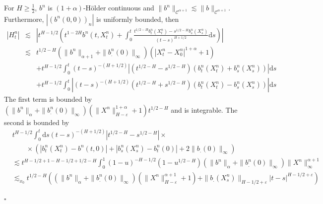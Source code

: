 \documentclass[a4paper,11pt]{article}
\newcommand{\mathd}{\mathrm{d}}
\newenvironment{proof}{{\sc Proof.}}{\hfill$\square$}
\newcommand{\CC}{\mathscr C}
\begin{document}
\begin{proof}
  For $H \geqslant \frac{1}{2}$, $b^{n}$ is $( 1+ \alpha)$-H\"older
  continuous and $\|b^{n} \|_{\CC^{\alpha +1}} \lesssim \|b\|_{\CC^{\alpha
  +1}}$. Furthermore, $|(b^{n} (0,0))_{n} |$ is uniformly bounded, then
  \begin{eqnarray*}
    | H_{t}^{n} | & \lesssim & \left\lvert t^{H-1/2}  \left( t^{1-2H} b^{n}
    (t,X^{n}_{t} )+ \int_{0}^{t} \frac{t^{1/2-H} b^{n}_{t} (X^{n}_{t}
    )-s^{1/2-H} b^{n}_{s} (X^{n}_{s} )}{(t-s)^{H+1/2}} \mathd s \right)
    \right\lvert\\
    & \lesssim & t^{1/2-H} ( \|b^{n} \|_{\alpha +1} + \| b^{n}_{.} ( 0 )
    \|_{\infty} ) (|X^{n}_{t} -X^{n}_{0} |^{1+ \alpha} +1)\\
    &  & +t^{H-1/2}  \int_{0}^{t} (t-s)^{- (H+1/2)}  | ( t^{1/2-H} -s^{1/2-H}
    )  ( b^{n}_{t} (X_{t}^{n} )+b^{n}_{s} (X_{s}^{n} ) ) | \mathd s\\
    &  & +t^{H-1/2}  \int_{0}^{t} | (t-s)^{-(H+1/2)}  ( t^{1/2-H} +s^{1/2-H}
    )  ( b^{n}_{t} (X_{t}^{n} )-b^{n}_{s} (X_{s}^{n} ) ) | \mathd s
  \end{eqnarray*}
  The first term is bounded by $( \| b^{n} \|_{\alpha} + \| b^{n}_{.} ( 0 )
  \|_{\infty} ) ( \| X^{n} \|^{1+ \alpha}_{H- \varepsilon} +1) t^{1/2-H}$ and
  is integrable. The second is bounded by
  \begin{equation*}
  \begin{split}
   & t^{H-1/2}  \int_{0}^{t} \mathd s (t-s)^{- (H+1/2)} | t^{1/2-H}
     -s^{1/2-H} |\times \\ & \qquad \times ( | b^{n}_{t} (X_{t}^{n} )-b^{n} (t,0) | + | b^{n}_{s}
     (X_{s}^{n} )-b^{n}_{t} (0) | +2 \| b_{.} ( 0 ) \|_{\infty} )  
  \\ & \lesssim t^{H-1/2+1-H-1/2+1/2-H} \int_{0}^{1} ( 1-u )^{-H-1/2} (
     1-u^{1/2-H} ) ( \| b^{n} \|_{\alpha} + \| b^{n}_{.} ( 0 ) \|_{\infty} )
     \| X^{n} \|_{\infty}^{\alpha +1} 
  \\ & \lesssim_{x_{0}} t^{1/2-H} ( ( \| b^{n} \|_{\alpha} + \| b^{n}_{.} ( 0 )
     \|_{\infty} ) ( \| X^{n} \|_{H- \varepsilon}^{\alpha +1} +1 ) + \| b_{.}
     ( X^{n}_{s} ) \|_{H-1/2+ \varepsilon} | t-s |^{H-1/2+ \varepsilon} ) \end{split}
     \end{equation*}
  

\end{proof}
\end{document}
